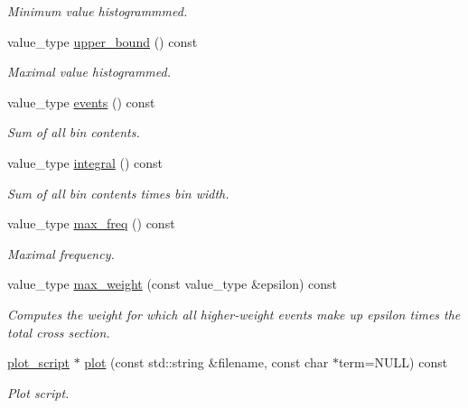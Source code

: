 \begin{DoxyCompactItemize}
\begin{DoxyCompactList}\small\item\em Minimum value histogrammmed. \end{DoxyCompactList}\item 
\hypertarget{a00596_a7157c09ebc3d0eab093075c027cc70bf}{}value\+\_\+type \hyperlink{a00596_a7157c09ebc3d0eab093075c027cc70bf}{upper\+\_\+bound} () const \label{a00596_a7157c09ebc3d0eab093075c027cc70bf}

\begin{DoxyCompactList}\small\item\em Maximal value histogrammed. \end{DoxyCompactList}\item 
\hypertarget{a00596_ad978b54ae1fd228c547e9b65fb2fa8bd}{}value\+\_\+type \hyperlink{a00596_ad978b54ae1fd228c547e9b65fb2fa8bd}{events} () const \label{a00596_ad978b54ae1fd228c547e9b65fb2fa8bd}

\begin{DoxyCompactList}\small\item\em Sum of all bin contents. \end{DoxyCompactList}\item 
\hypertarget{a00596_afe3d42e15eeef2c8720484eb7e69f79e}{}value\+\_\+type \hyperlink{a00596_afe3d42e15eeef2c8720484eb7e69f79e}{integral} () const \label{a00596_afe3d42e15eeef2c8720484eb7e69f79e}

\begin{DoxyCompactList}\small\item\em Sum of all bin contents times bin width. \end{DoxyCompactList}\item 
\hypertarget{a00596_a4aac02b910231940ba7a86545002d79c}{}value\+\_\+type \hyperlink{a00596_a4aac02b910231940ba7a86545002d79c}{max\+\_\+freq} () const \label{a00596_a4aac02b910231940ba7a86545002d79c}

\begin{DoxyCompactList}\small\item\em Maximal frequency. \end{DoxyCompactList}\item 
value\+\_\+type \hyperlink{a00596_a8ac6da412698412ff7ea54f3cd5f3595}{max\+\_\+weight} (const value\+\_\+type \&epsilon) const 
\begin{DoxyCompactList}\small\item\em Computes the weight for which all higher-\/weight events make up epsilon times the total cross section. \end{DoxyCompactList}\item 
\hypertarget{a00596_a0e1b046ad4fb04b7ddd15461807a0943}{}\hyperlink{a00431}{plot\+\_\+script} $\ast$ \hyperlink{a00596_a0e1b046ad4fb04b7ddd15461807a0943}{plot} (const std\+::string \&filename, const char $\ast$term=N\+U\+L\+L) const \label{a00596_a0e1b046ad4fb04b7ddd15461807a0943}

\begin{DoxyCompactList}\small\item\em Plot script. \end{DoxyCompactList}\end{DoxyCompactItemize}
